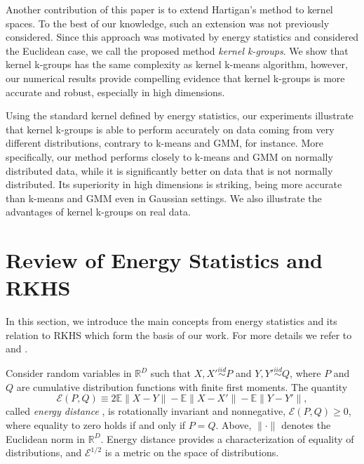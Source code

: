 \documentclass[10pt,journal,compsoc]{IEEEtran}
\newcommand\Energy{\mathcal{E}}
\newcommand\E{\mathbb{E}}
\begin{document}
Another contribution of this paper is to extend 
Hartigan's method to  kernel spaces. 
To the best of our knowledge, such an extension was not previously considered.
Since this approach was motivated by energy statistics and  
\cite{Kgroups} considered the Euclidean case, we call the 
proposed method \emph{kernel k-groups}.
We show that kernel k-groups 
has the same complexity as kernel k-means algorithm, however,
our numerical results provide compelling evidence that 
kernel k-groups 
is more accurate and robust, especially in high dimensions. 

Using the standard kernel defined by energy
statistics, our experiments illustrate 
that kernel k-groups
is able to perform accurately on data coming from 
very different distributions, contrary to k-means and GMM, for instance.
More specifically, our method performs 
closely to k-means and GMM on normally distributed data, while
it is significantly better on data that 
is not normally distributed. 
Its superiority in high dimensions
is striking, being more accurate than k-means and GMM 
even in Gaussian settings. We also illustrate the advantages of
kernel k-groups on real data. 


\section{Review of Energy Statistics and RKHS}
\label{sec:background}

In this section, we introduce the main concepts from energy
statistics and its relation to 
RKHS which form the basis of our work.
For more details we refer 
to \cite{Szkely2013} and \cite{Lyons,Sejdinovic2013}.

Consider random variables in $\mathbb{R}^D$ 
such that $X,X' \stackrel{iid}{\sim} P$ and 
$Y,Y' \stackrel{iid}{\sim} Q$, where $P$ and $Q$ are cumulative
distribution functions with finite first moments. 
The quantity 
\begin{equation}
\label{eq:energy}
\Energy(P, Q) \equiv 2 \E \| X - Y\| - \E \| X - X' \| - \E \| Y - Y' \|,
\end{equation}
called \emph{energy distance} \cite{Szkely2013}, 
is rotationally invariant and nonnegative, $\Energy(P,Q) \ge 0$, where
equality
to zero holds if and only if $P = Q$.
Above, $\| \cdot \|$ denotes the
Euclidean norm in $\mathbb{R}^D$. 
Energy distance
provides a characterization of equality of distributions, and
$\Energy^{1/2}$ is
a metric on the space of distributions.
\end{document}
